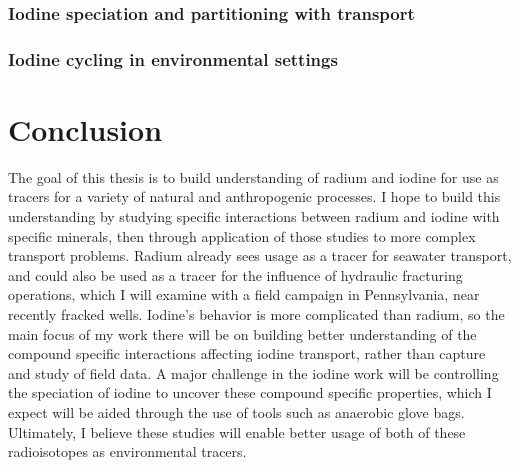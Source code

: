 \documentclass[twoside,12pt,titlepage]{article}
\begin{document}
\subsubsection{Iodine speciation and partitioning with transport}

\subsubsection{Iodine cycling in environmental settings}

\section{Conclusion}

The goal of this thesis is to build understanding of radium and iodine for use as tracers for a variety of natural and anthropogenic processes. I hope to build this understanding by studying specific interactions between radium and iodine with specific minerals, then through application of those studies to more complex transport problems. Radium already sees usage as a tracer for seawater transport, and could also be used as a tracer for the influence of hydraulic fracturing operations, which I will examine with a field campaign in Pennsylvania, near recently fracked wells. Iodine's behavior is more complicated than radium, so the main focus of my work there will be on building better understanding of the compound specific interactions affecting iodine transport, rather than capture and study of field data. A major challenge in the iodine work will be controlling the speciation of iodine to uncover these compound specific properties, which I expect will be aided through the use of tools such as anaerobic glove bags. Ultimately, I believe these studies will enable better usage of both of these radioisotopes as environmental tracers.



\end{document}
